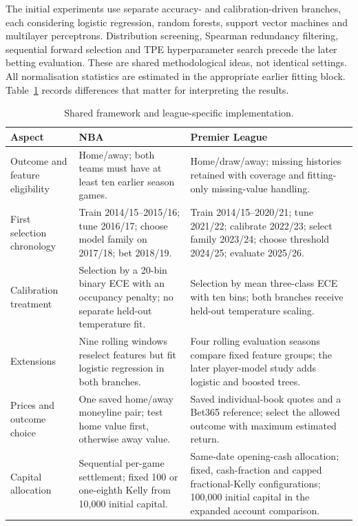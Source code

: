 The initial experiments use separate accuracy- and calibration-driven
branches, each considering logistic regression, random forests, support vector
machines and multilayer perceptrons. Distribution screening, Spearman
redundancy filtering, sequential forward selection and TPE hyperparameter
search precede the later betting evaluation. These are shared methodological
ideas, not identical settings. All normalisation statistics are estimated in
the appropriate earlier fitting block. Table~\ref{tab:league_method_differences}
records differences that matter for interpreting the results.

\begin{table}[htbp]
\centering
\small
\caption{Shared framework and league-specific implementation.}
\label{tab:league_method_differences}
\begin{tabular}{p{}p{}p{}}
\toprule
Aspect & NBA & Premier League \\
\midrule
Outcome and feature eligibility & Home/away; both teams must have at least
ten earlier season games. & Home/draw/away; missing histories retained with
coverage and fitting-only missing-value handling. \\
First selection chronology & Train 2014/15--2015/16; tune 2016/17; choose
model family on 2017/18; bet 2018/19. & Train 2014/15--2020/21; tune 2021/22;
calibrate 2022/23; select family 2023/24; choose threshold 2024/25; evaluate
2025/26. \\
Calibration treatment & Selection by a 20-bin binary ECE with an occupancy
penalty; no separate held-out temperature fit. & Selection by mean three-class
ECE with ten bins; both branches receive held-out temperature scaling. \\
Extensions & Nine rolling windows reselect features but fit logistic
regression in both branches. & Four rolling evaluation seasons compare fixed
feature groups; the later player-model study adds logistic and boosted trees. \\
Prices and outcome choice & One saved home/away moneyline pair; test home
value first, otherwise away value. & Saved individual-book quotes and a
Bet365 reference; select the allowed outcome with maximum estimated return. \\
Capital allocation & Sequential per-game settlement; fixed 100 or one-eighth
Kelly from 10,000 initial capital. & Same-date opening-cash allocation;
fixed, cash-fraction and capped fractional-Kelly configurations; 100,000
initial capital in the expanded account comparison. \\
\bottomrule
\end{tabular}
\end{table}

